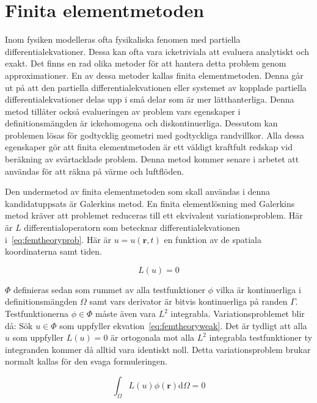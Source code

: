 \section{Finita elementmetoden}
\label{sec:femtheory}

Inom fysiken modelleras ofta fysikaliska fenomen med partiella differentialekvationer.
Dessa kan ofta vara icketriviala att evaluera analytiskt och exakt. Det finns en
rad olika metoder för att hantera detta problem genom approximationer. En av
dessa metoder kallas finita elementmetoden. Denna går ut på att den
partiella differentialekvationen eller systemet av kopplade partiella
differentialekvationer delas upp i små delar som är mer lätthanterliga.
Denna metod tillåter också evalueringen av problem vars egenskaper i
definitionsmängden är ickehomogena och diskontinuerliga. Dessutom kan
problemen lösas för godtycklig geometri med godtyckliga randvillkor. Alla
dessa egenskaper gör att finita elementmetoden är ett väldigt kraftfult redskap
vid beräkning av svårtacklade problem. Denna metod kommer senare i arbetet
att användas för att räkna på värme och luftflöden.

Den undermetod av finita elementmetoden som skall användas i denna
kandidatuppsats är Galerkins metod.
En finita elementlösning med Galerkins metod kräver att problemet reduceras till
ett ekvivalent variationsproblem.
Här är $L$ differentialoperatorn
som betecknar differentialekvationen i~\eqref{eq:femtheoryprob}.
Här är $u = u(\mathbf{r},t)$ en funktion av de spatiala koordinaterna samt tiden.

\begin{equation}
\label{eq:femtheoryprob}
L(u) = 0
\end{equation}

\noindent
$\Phi$ definieras sedan som rummet av alla testfunktioner $\phi$ vilka
 är kontinuerliga i
definitionsmängden $\Omega$ samt vars derivator är bitvis kontinuerliga på randen
$\Gamma$. Testfunktionerna $\phi \in \Phi$ måste även vara $L^2$ integrabla.
Variationsproblemet blir då: Sök $u\in\Phi$
som uppfyller ekvation~\eqref{eq:femtheoryweak}. Det är tydligt
att alla $u$ som uppfyller $L(u) = 0$ är ortogonala mot alla
$L^2$ integrabla testfunktioner ty integranden kommer då alltid vara identiskt noll.
Detta variationsproblem brukar normalt kallas för den svaga formuleringen.

\begin{equation}
\label{eq:femtheoryweak}
\int_\Omega L(u)\phi(\mathbf{r}) \mathrm{d}\Omega = 0
\end{equation}

